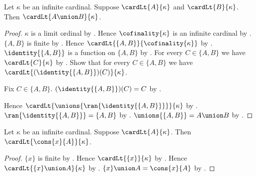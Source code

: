 \begin{theorem}\label{small_binary_union}
    Let $\kappa$ be an infinite cardinal.
    Suppose $\cardLt{A}{\kappa}$ and $\cardLt{B}{\kappa}$.
    Then $\cardLt{A\union B}{\kappa}$.
\end{theorem}
\begin{proof}
    $\kappa$ is a limit ordinal by
        .
    Hence $\cofinality{\kappa}$ is an infinite cardinal by
        .
    $\{A,B\}$ is finite by .
    Hence $\cardLt{\{A,B\}}{\cofinality{\kappa}}$ by
        .
    $\identity{\{A,B\}}$ is a function on $\{A,B\}$ by
        .
    For every $C\in\{A,B\}$ we have $\cardLt{C}{\kappa}$ by
        .
    Show that for every $C\in\{A,B\}$ we have
        $\cardLt{(\identity{\{A,B\}})(C)}{\kappa}$.
    \begin{subproof}
        Fix $C\in\{A,B\}$.
        $(\identity{\{A,B\}})(C)=C$ by .
    \end{subproof}
    Hence $\cardLt{\unions{\ran{\identity{\{A,B\}}}}}{\kappa}$ by
        .
    $\ran{\identity{\{A,B\}}}=\{A,B\}$ by .
    $\unions{\{A,B\}}=A\union B$ by .
\end{proof}

\begin{corollary}\label{small_cons}
    Let $\kappa$ be an infinite cardinal.
    Suppose $\cardLt{A}{\kappa}$.
    Then $\cardLt{\cons{x}{A}}{\kappa}$.
\end{corollary}
\begin{proof}
    $\{x\}$ is finite by .
    Hence $\cardLt{\{x\}}{\kappa}$ by .
    Hence $\cardLt{\{x\}\union A}{\kappa}$ by
        .
    $\{x\}\union A=\cons{x}{A}$ by
        .
\end{proof}

